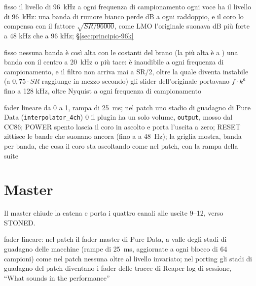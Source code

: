{fisso}
{il livello di \qty{96}{\kilo\hertz}}
{a ogni frequenza di campionamento ogni voce ha il livello di \qty{96}{\kilo\hertz}: una banda di rumore bianco perde  dB a ogni raddoppio, e il coro lo compensa con il fattore $\sqrt{SR/96000}$, come LMO}
{l'originale suonava  dB più forte a 48 kHz che a 96 kHz; \S\ref{sec:principio-96k}}
{\deciso}
{}

{fisso}
{nessuna banda è così alta con le costanti del brano (la più alta è a )}
{una banda con il centro a \qty{20}{\kilo\hertz} o più tace: è inaudibile a ogni frequenza di campionamento, e il filtro non arriva mai a SR/2, oltre la quale diventa instabile (a $0{,}75 \cdot SR$ raggiunge  in mezzo secondo)}
{gli slider dell'originale portavano $f \cdot k^{a}$ fino a 128 kHz, oltre Nyquist a ogni frequenza di campionamento}
{\deciso}
{}

{fader lineare da 0 a 1, rampa di \qty{25}{\milli\second}; nel patch uno stadio di guadagno di Pure Data (\texttt{interpolator\_4ch})}
{0}
{il plugin ha un solo volume, \texttt{output}, mosso dal CC86; POWER spento lascia il coro in ascolto e porta l'uscita a zero; RESET zittisce le bande che suonano ancora (fino a  a \qty{48}{\hertz}); la griglia mostra, banda per banda, che cosa il coro sta ascoltando}
{come nel patch, con la rampa della suite}
{\daprovare}
{}

\section{Master}
Il master chiude la catena e porta i quattro canali alle uscite 9--12, verso STONED.

{fader lineare: nel patch il fader master di Pure Data, a valle degli stadi di guadagno delle macchine (rampe di \qty{25}{\milli\second}, aggiornate a ogni blocco di 64 campioni)}
{come nel patch}
{nessuna oltre al livello}
{invariato; nel porting gli stadi di guadagno del patch diventano i fader delle tracce di Reaper}
{\daprovare}
{log di sessione, ``What sounds in the performance''}
